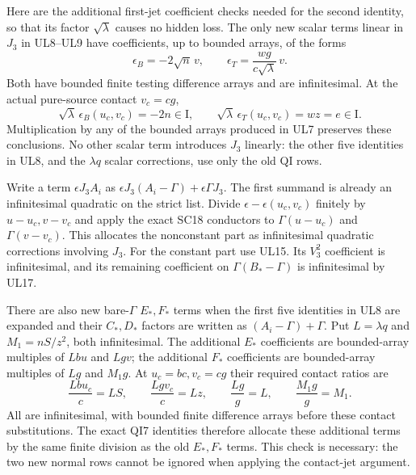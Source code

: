 Here are the additional first-jet coefficient checks needed for
the second identity, so that its factor $\sqrt\lambda$ causes
no hidden loss. The only new scalar terms linear in $J_3$ in
UL8--UL9 have coefficients, up to bounded arrays, of the forms
\[
 \epsilon_B=-2\sqrt n\,v,\qquad
 \epsilon_T=\frac{wg}{c\sqrt\lambda}\,v .
                                                               \tag{UL16}
\]
Both have bounded finite testing difference arrays and are
infinitesimal. At the actual pure-source contact $v_c=cg$,
\[
 \sqrt\lambda\,\epsilon_B(u_c,v_c)=-2n\in\mathrm I,\qquad
 \sqrt\lambda\,\epsilon_T(u_c,v_c)=wz=e\in\mathrm I.             \tag{UL17}
\]
Multiplication by any of the bounded arrays produced in UL7
preserves these conclusions. No other scalar term introduces
$J_3$ linearly: the other five identities in UL8, and the
$\lambda q$ scalar corrections, use only the old QI rows.

Write a term $\epsilon J_3A_i$ as
$\epsilon J_3(A_i-\Gamma)+\epsilon\Gamma J_3$.
The first summand is already an infinitesimal quadratic on the
strict list. Divide $\epsilon-\epsilon(u_c,v_c)$ finitely by
$u-u_c,v-v_c$ and apply the exact SC18 conductors to
$\Gamma(u-u_c)$ and $\Gamma(v-v_c)$. This allocates the
nonconstant part as infinitesimal quadratic corrections involving
$J_3$. For the constant part use UL15. Its $V_3^2$
coefficient is infinitesimal, and its remaining coefficient on
$\Gamma(B_*-\Gamma)$ is infinitesimal by UL17.

There are also new bare-$\Gamma$ $E_*,F_*$ terms when the
first five identities in UL8 are expanded and their $C_*,D_*$
factors are written as $(A_i-\Gamma)+\Gamma$. Put
$L=\lambda q$ and $M_1=nS/z^2$, both infinitesimal.
The additional $E_*$ coefficients are bounded-array multiples
of $Lbu$ and $Lgv$; the additional $F_*$ coefficients are
bounded-array multiples of $Lg$ and $M_1g$.
At $u_c=bc,v_c=cg$ their required contact ratios are
\[
 \frac{Lbu_c}{c}=LS,\qquad
 \frac{Lgv_c}{c}=Lz,\qquad
 \frac{Lg}{g}=L,\qquad
 \frac{M_1g}{g}=M_1 .
                                                               \tag{UL18}
\]
All are infinitesimal, with bounded finite difference arrays
before these contact substitutions. The exact QI7 identities
therefore allocate these additional terms by the same finite
division as the old $E_*,F_*$ terms. This check is necessary:
the two new normal rows cannot be ignored when applying the
contact-jet argument.

